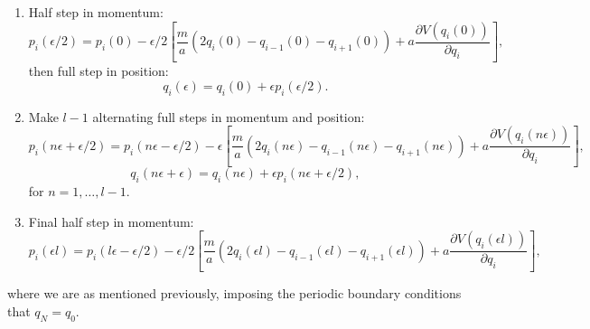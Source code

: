 \documentclass[12pt]{article}
\begin{document}
            \begin{enumerate}
                \item Half step in momentum:
                \begin{equation}
                    \label{eq:MomentumInitialHalfStepQuadraticQHO}
                    p_i\left(\epsilon/2\right) = p_i\left(0\right) - \epsilon/2\left[\frac{m}{a}\left(2q_i\left(0\right)-q_{i-1}\left(0\right)-q_{i+1}\left(0\right)\right)+a\frac{\partial V\left(q_i\left(0\right)\right)}{\partial q_i}\right],
                \end{equation}
                then full step in position:
                \begin{equation}
                    \label{eq:PositionInitialStepQuadraticQHO}
                    q_i\left(\epsilon\right) = q_i\left(0\right) + \epsilon p_i\left(\epsilon/2\right).
                \end{equation}
                \item Make $l-1$ alternating full steps in momentum and position:
                \begin{equation}
                    \label{eq:MomentumFullStepQuadraticQHO}
                    p_i\left(n\epsilon+\epsilon/2\right) = p_i\left(n\epsilon-\epsilon/2\right) - \epsilon\left[\frac{m}{a}\left(2q_i\left(n\epsilon\right)-q_{i-1}\left(n\epsilon\right)-q_{i+1}\left(n\epsilon\right)\right)+a\frac{\partial V\left(q_i\left(n\epsilon\right)\right)}{\partial q_i}\right],
                \end{equation}
                \begin{equation}
                    \label{eq:PositionFullStepQuadraticQHO}
                    q_i\left(n\epsilon+\epsilon\right) = q_i\left(n\epsilon\right) + \epsilon p_i\left(n\epsilon+\epsilon/2\right),
                \end{equation}
                for $n = 1, \dots , l-1$.
                \item Final half step in momentum:
                \begin{equation}
                    \label{eq:MomnetumQuadraticKinetic}
                    p_i\left(\epsilon l\right) = p_i\left(l\epsilon-\epsilon/2\right) - \epsilon/2\left[\frac{m}{a}\left(2q_i\left(\epsilon l\right)-q_{i-1}\left(\epsilon l\right)-q_{i+1}\left(\epsilon l\right)\right)+a\frac{\partial V\left(q_i\left(\epsilon l\right)\right)}{\partial q_i}\right],
                \end{equation}
            \end{enumerate}
            where we are as mentioned previously, imposing the periodic boundary conditions that $q_N=q_0$.
\end{document}

